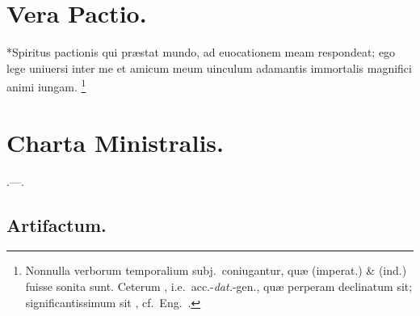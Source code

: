 \documentclass[12pt]{book}
\newcommand{\reconst}{*}
\begin{document}
\section{Vera Pactio.}\label{vera-pactio}
\reconst{}Spiritus pactionis qui præstat mundo,
ad euocationem meam respondeat;
ego lege uniuersi inter me et amicum meum
uinculum adamantis immortalis magnifici animi iungam.
%
\footnote{%
  Nonnulla verborum temporalium subj.\ coniugantur,
  quæ  (imperat.) \&  (ind.) fuisse sonita sunt.
  Ceterum , i.e.\ acc.-\emph{dat.}-gen.,
  quæ perperam declinatum sit;
  significantissimum sit
  ,
  cf.~Eng.\ .
}


\section{Charta Ministralis.}\label{charta-ministralis}
.---.

\subsection{Artifactum.}\label{artifactum}
\end{document}
